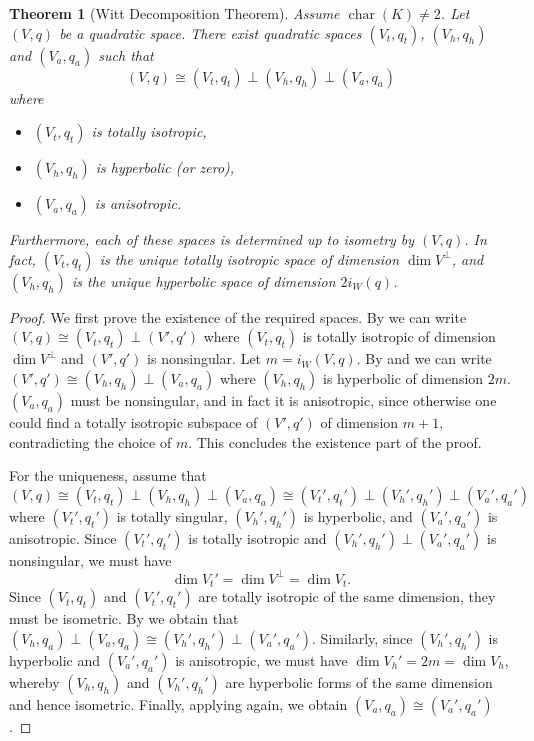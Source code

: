 \documentclass[12pt, leqno, british]{amsart}
\theoremstyle{definition}
\theoremstyle{plain}
\newtheorem{thm}[defi]{Theorem}
\theoremstyle{remark}
\DeclareMathOperator{\charac}{char}
\begin{document}
\begin{thm}[Witt Decomposition Theorem]\label{T:Witt-Decomposition}
Assume $\charac(K) \neq 2$.
Let $(V, q)$ be a quadratic space.
There exist quadratic spaces $(V_t, q_t)$, $(V_h, q_h)$ and $(V_a, q_a)$ such that
$$ (V, q) \cong (V_t, q_t) \perp (V_h, q_h) \perp (V_a, q_a)$$ where
\begin{itemize}
\item $(V_t, q_t)$ is totally isotropic,
\item $(V_h, q_h)$ is hyperbolic (or zero),
\item $(V_a, q_a)$ is anisotropic.
\end{itemize}
Furthermore, each of these spaces is determined up to isometry by $(V, q)$.
In fact, $(V_t, q_t)$ is the unique totally isotropic space of dimension $\dim V^\perp$, and $(V_h, q_h)$ is the unique hyperbolic space of dimension $2i_W(q)$.
\end{thm}
\begin{proof}
We first prove the existence of the required spaces.
By  we can write $(V, q) \cong (V_t, q_t) \perp (V', q')$ where $(V_t, q_t)$ is totally isotropic of dimension $\dim V^\perp$ and $(V', q')$ is nonsingular.
Let $m = i_W(V, q)$.
By  and  we can write $(V', q') \cong (V_h, q_h) \perp (V_a, q_a)$ where $(V_h, q_h)$ is hyperbolic of dimension $2m$.
$(V_a, q_a)$ must be nonsingular, and in fact it is anisotropic, since otherwise one could find a totally isotropic subspace of $(V', q')$ of dimension $m+1$, contradicting the choice of $m$.
This concludes the existence part of the proof.

For the uniqueness, assume that
$$ (V, q) \cong (V_t, q_t) \perp (V_h, q_h) \perp (V_a, q_a) \cong (V_t', q_t') \perp (V_h', q_h') \perp (V_a', q_a')$$
where $(V_t', q_t')$ is totally singular, $(V_h', q_h')$ is hyperbolic, and $(V_a', q_a')$ is anisotropic.
Since $(V_t', q_t')$ is totally isotropic and $(V_h', q_h') \perp (V_a', q_a')$ is nonsingular, we must have
$$ \dim V_t' = \dim V^\perp = \dim V_t.$$
Since $(V_t, q_t)$ and $(V_t', q_t')$ are totally isotropic of the same dimension, they must be isometric.
By  we obtain that $(V_h, q_a) \perp (V_a, q_a) \cong (V_h', q_h') \perp (V_a', q_a')$.
Similarly, since $(V_h', q_h')$ is hyperbolic and $(V_a', q_a')$ is anisotropic, we must have $\dim V_h' = 2m = \dim V_h$, whereby $(V_h, q_h)$ and $(V_h', q_h')$ are hyperbolic forms of the same dimension and hence isometric.
Finally, applying  again, we obtain $(V_a, q_a) \cong (V_a', q_a')$.
\end{proof}
\end{document}
